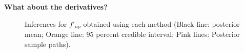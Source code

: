\documentclass{beamer} %
\begin{document}
\begin{frame}
\textbf{What about the derivatives?}

\begin{figure}[p]
    \centering
    \caption{\fontsize{9}{11}\selectfont Inferences for $f'_{np}$ obtained using each method (Black line: posterior mean; Orange line: 95 percent credible interval; Pink lines: Posterior sample paths). }
    \label{fig:comparingTwoG1st_realdata}
\end{figure}
\end{frame}
\end{document}
